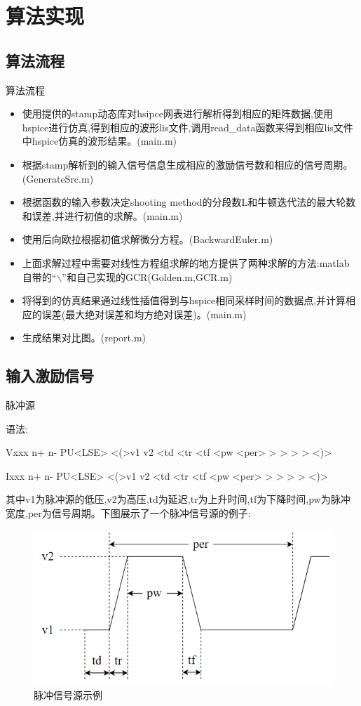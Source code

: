 \documentclass[12pt]{article}
\begin{document}
\begin{sloppypar}
\section{算法实现}

\subsection{算法流程}
\qquad 算法流程
\begin{itemize}
  \item 使用提供的stamp动态库对hsipce网表进行解析得到相应的矩阵数据,使用hspice进行仿真,得到相应的波形lis文件,调用read\_data函数来得到相应lis文件中hspice仿真的波形结果。(main.m)
  \item 根据stamp解析到的输入信号信息生成相应的激励信号数和相应的信号周期。(GenerateSrc.m)
  \item 根据函数的输入参数决定shooting method的分段数L和牛顿迭代法的最大轮数和误差,并进行初值的求解。(main.m)
  \item 使用后向欧拉根据初值求解微分方程。(BackwardEuler.m)
  \item 上面求解过程中需要对线性方程组求解的地方提供了两种求解的方法:matlab自带的“$\backslash$”和自己实现的GCR(Golden.m,GCR.m)
  \item 将得到的仿真结果通过线性插值得到与hspice相同采样时间的数据点,并计算相应的误差(最大绝对误差和均方绝对误差)。(main.m)
  \item 生成结果对比图。(report.m)
\end{itemize}

\subsection{输入激励信号}
\qquad 脉冲源

\qquad 语法:

\qquad Vxxx n+ n- PU<LSE> <(>v1 v2 <td <tr <tf <pw <per> > > > > <)>

\qquad Ixxx n+ n- PU<LSE> <(>v1 v2 <td <tr <tf <pw <per> > > > > <)>

\qquad 其中v1为脉冲源的低压,v2为高压,td为延迟,tr为上升时间,tf为下降时间,pw为脉冲宽度,per为信号周期。下图展示了一个脉冲信号源的例子:

\begin{figure}[H]
  \centering
  \includegraphics[width=0.5\columnwidth]{figure/pulse.png}
  \caption{脉冲信号源示例}
\end{figure}


\end{sloppypar}
\end{document}
